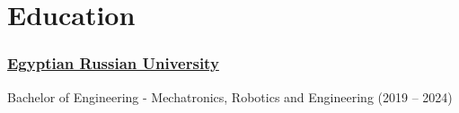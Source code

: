 \section*{Education}
%
%
%
\subsubsection*{
  \large\blackColor
  \href{https://www.eru.edu.eg/}{Egyptian Russian University}
}
Bachelor of Engineering - Mechatronics, Robotics and Engineering (2019 -- 2024)
